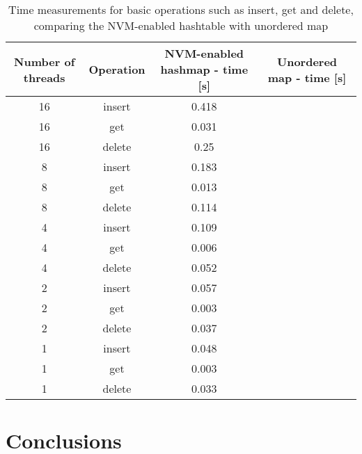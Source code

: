         \begin{table}[h]
        \caption{Time measurements for basic operations such as insert, get and delete, comparing the NVM-enabled hashtable with unordered map}\label{tab:tabela}
        \centering\footnotesize%
            \begin{tabular}{|c|c|c|c|} 
                \toprule
                Number of threads & Operation & NVM-enabled hashmap - time [s] & Unordered map - time [s] \\
                \midrule
                16 & insert & 0.418 & \\
                16 & get & 0.031 &    \\
                16 & delete & 0.25 &  \\
                \midrule
                8 & insert & 0.183 &  \\
                8 & get & 0.013 &     \\
                8 & delete & 0.114 &  \\
                \midrule
                4 & insert & 0.109 &  \\
                4 & get & 0.006 &     \\
                4 & delete & 0.052 &  \\
                \midrule
                2 & insert & 0.057 &  \\
                2 & get & 0.003 &     \\
                2 & delete & 0.037 &  \\
                \midrule
                1 & insert & 0.048 &  \\
                1 & get & 0.003 &     \\
                1 & delete & 0.033 &  \\
                \bottomrule
            \end{tabular}
        \end{table}


\section{Conclusions}

